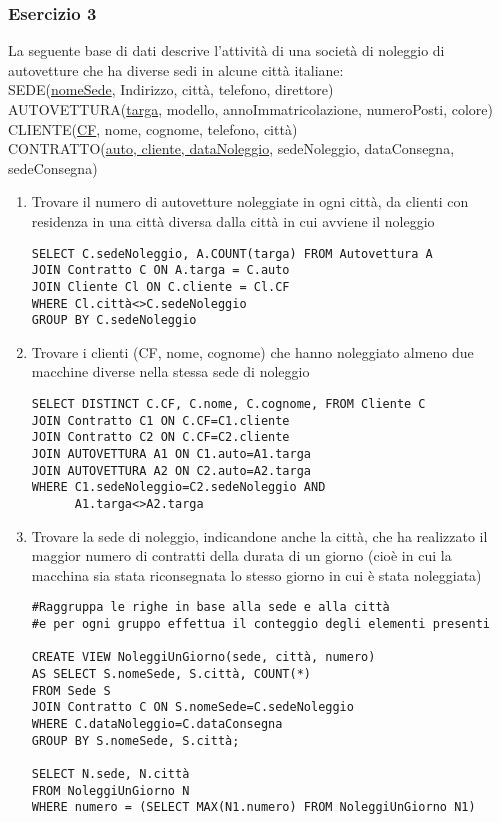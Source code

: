 \documentclass[a4paper]{article}
\begin{document}
\subsubsection{Esercizio 3}
La seguente base di dati descrive l'attività di una società di noleggio di autovetture che ha diverse sedi in alcune città italiane:\medskip\\
SEDE(\underline{nomeSede}, Indirizzo, città, telefono, direttore)\\
AUTOVETTURA(\underline{targa}, modello, annoImmatricolazione, numeroPosti, colore)\\
CLIENTE(\underline{CF}, nome, cognome, telefono, città)\\
CONTRATTO(\underline{auto, cliente, dataNoleggio}, sedeNoleggio, dataConsegna, sedeConsegna)
%
\begin{enumerate}
\item Trovare il numero di autovetture noleggiate in ogni città, da clienti con residenza in una città diversa dalla città in cui avviene il noleggio
\begin{verbatim}
SELECT C.sedeNoleggio, A.COUNT(targa) FROM Autovettura A
JOIN Contratto C ON A.targa = C.auto
JOIN Cliente Cl ON C.cliente = Cl.CF
WHERE Cl.città<>C.sedeNoleggio
GROUP BY C.sedeNoleggio
\end{verbatim}
\item Trovare i clienti (CF, nome, cognome) che hanno noleggiato almeno due macchine diverse nella stessa sede di noleggio
\begin{verbatim}
SELECT DISTINCT C.CF, C.nome, C.cognome, FROM Cliente C
JOIN Contratto C1 ON C.CF=C1.cliente
JOIN Contratto C2 ON C.CF=C2.cliente
JOIN AUTOVETTURA A1 ON C1.auto=A1.targa
JOIN AUTOVETTURA A2 ON C2.auto=A2.targa
WHERE C1.sedeNoleggio=C2.sedeNoleggio AND
      A1.targa<>A2.targa
\end{verbatim}
\item Trovare la sede di noleggio, indicandone anche la città, che ha realizzato il maggior numero di contratti della durata di un giorno (cioè in cui la macchina sia stata riconsegnata lo stesso giorno in cui è stata noleggiata)
\begin{verbatim}
#Raggruppa le righe in base alla sede e alla città
#e per ogni gruppo effettua il conteggio degli elementi presenti

CREATE VIEW NoleggiUnGiorno(sede, città, numero)
AS SELECT S.nomeSede, S.città, COUNT(*)
FROM Sede S
JOIN Contratto C ON S.nomeSede=C.sedeNoleggio
WHERE C.dataNoleggio=C.dataConsegna
GROUP BY S.nomeSede, S.città;

SELECT N.sede, N.città
FROM NoleggiUnGiorno N
WHERE numero = (SELECT MAX(N1.numero) FROM NoleggiUnGiorno N1)
\end{verbatim}
\end{enumerate}
\end{document}
